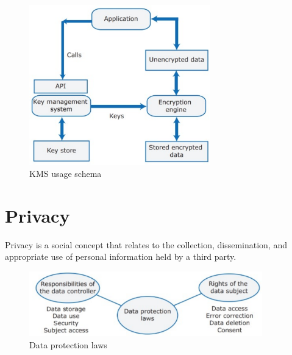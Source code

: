 \begin{figure} [H]
    \centering
    \includegraphics[width=0.7\textwidth]{images/Security/KMS.png}
    \caption{KMS usage schema}
    \label{fig:KMS}
\end{figure} 

\section{Privacy}

Privacy is a social concept that relates to the collection, dissemination, and appropriate use of personal information held by a third party.

\begin{figure} [H]
    \centering
    \includegraphics[width=0.9\textwidth]{images/Security/privacy-laws.png}
    \caption{Data protection laws}
    \label{fig:privacy-laws}
\end{figure} 

